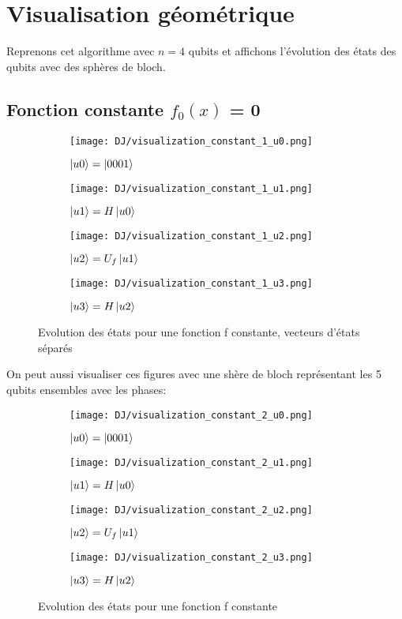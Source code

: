 \section{Visualisation géométrique}
Reprenons cet algorithme avec $n=4$ qubits et affichons l'évolution des états des qubits avec des sphères de bloch.

\subsection{Fonction constante $f_0(x)$ = 0}
\medbreak
\begin{figure}[ht]
  \begin{subfigure}[b]{0.6\textwidth}
      \centering
      \texttt{[image: DJ/visualization\_constant\_1\_u0.png]}
      \caption{$\ket{u0}=\ket{0001}$}
  \end{subfigure}
  \begin{subfigure}[b]{0.6\textwidth}
      \centering
      \texttt{[image: DJ/visualization\_constant\_1\_u1.png]}
      \caption{$\ket{u1}=H\ket{u0}$}
  \end{subfigure}
  \begin{subfigure}[b]{0.6\textwidth}
      \centering
      \texttt{[image: DJ/visualization\_constant\_1\_u2.png]}
      \caption{$\ket{u2}=U_f\ket{u1}$}
  \end{subfigure}
  \begin{subfigure}[b]{0.6\textwidth}
    \centering
    \texttt{[image: DJ/visualization\_constant\_1\_u3.png]}
    \caption{$\ket{u3}=H\ket{u2}$}
\end{subfigure}
     \caption{Evolution des états pour une fonction f constante, vecteurs d'états séparés}
\end{figure}

\pagebreak

On peut aussi visualiser ces figures avec une shère de bloch représentant les 5 qubits ensembles avec les phases:

\begin{figure}[bth]
  \begin{subfigure}[b]{0.25\textwidth}
      \centering
      \texttt{[image: DJ/visualization\_constant\_2\_u0.png]}
      \caption{$\ket{u0}=\ket{0001}$}
  \end{subfigure}
  \begin{subfigure}[b]{0.25\textwidth}
      \centering
      \texttt{[image: DJ/visualization\_constant\_2\_u1.png]}
      \caption{$\ket{u1}=H\ket{u0}$}
  \end{subfigure}
  \begin{subfigure}[b]{0.25\textwidth}
      \centering
      \texttt{[image: DJ/visualization\_constant\_2\_u2.png]}
      \caption{$\ket{u2}=U_f\ket{u1}$}
  \end{subfigure}
  \begin{subfigure}[b]{0.25\textwidth}
    \centering
    \texttt{[image: DJ/visualization\_constant\_2\_u3.png]}
    \caption{$\ket{u3}=H\ket{u2}$}
\end{subfigure}
     \caption{Evolution des états pour une fonction f constante}
\end{figure}

